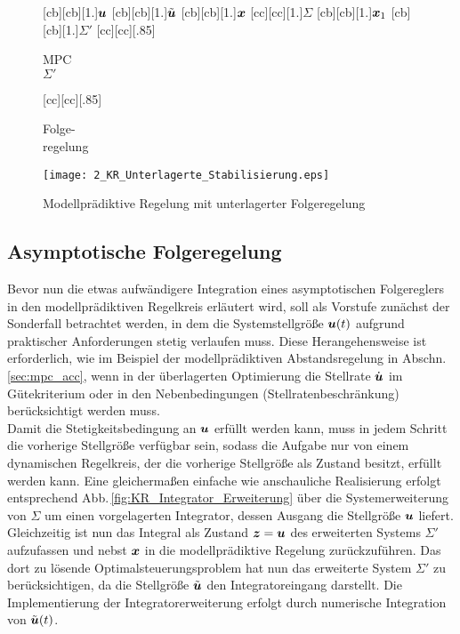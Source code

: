 \begin{figure}[h]
\centering
\newcommand{\smallsize}{.85}
		[cb][cb][1.]{$\boldsymbol{u}$}
		[cb][cb][1.]{$\tilde{\boldsymbol{u}}$}
		[cb][cb][1.]{$\boldsymbol{x}$}
		[cc][cc][1.]{$\Sigma$}
		[cb][cb][1.]{$\boldsymbol{x}_1$}
		[cb][cb][1.]{$\Sigma'$}
		[cc][cc][\smallsize]{\parbox[c]{7cm}{\begin{center}MPC\\ $\Sigma'$ \end{center}}}
				[cc][cc][\smallsize]{\parbox[c]{7cm}{\begin{center}Folge- \\ regelung \end{center}}}
	\texttt{[image: 2\_KR\_Unterlagerte\_Stabilisierung.eps]}
	\caption{Modellprädiktive Regelung mit unterlagerter Folgeregelung}
	\label{fig:KR_Unterlagerte_Stabilisierung}
\end{figure}

\subsection{Asymptotische Folgeregelung} \label{sec:asymptotische_folgeregelung}
Bevor nun die etwas aufwändigere Integration eines asymptotischen Folgereglers in den modellprädiktiven Regelkreis erläutert wird, soll als Vorstufe zunächst der Sonderfall betrachtet werden, in dem die Systemstellgröße $\boldsymbol{u}(t)$ aufgrund praktischer Anforderungen stetig verlaufen muss. Diese Herangehensweise ist erforderlich, wie im Beispiel der modellprädiktiven Abstandsregelung in Abschn.\,\ref{sec:mpc_acc}, wenn in der überlagerten Optimierung die Stellrate $\dot{\boldsymbol{u}}$ im Gütekriterium oder in den Nebenbedingungen (Stellratenbeschränkung) berücksichtigt werden muss. \\
Damit die Stetigkeitsbedingung an $\boldsymbol{u}$ erfüllt werden kann, muss in jedem Schritt die vorherige Stellgröße verfügbar sein, sodass die Aufgabe nur von einem dynamischen Regelkreis, der die vorherige Stellgröße als Zustand besitzt, erfüllt werden kann. Eine gleichermaßen einfache wie anschauliche Realisierung erfolgt entsprechend Abb.\,\ref{fig:KR_Integrator_Erweiterung} über die Systemerweiterung von $\Sigma$ um einen vorgelagerten Integrator, dessen Ausgang die Stellgröße $\boldsymbol{u}$ liefert. Gleichzeitig ist nun das Integral als Zustand $\boldsymbol{z}=\boldsymbol{u}$ des erweiterten Systems $\Sigma'$ aufzufassen und nebst $\boldsymbol{x}$ in die modellprädiktive Regelung zurückzuführen. Das dort zu lösende Optimalsteuerungsproblem hat nun das erweiterte System $\Sigma'$ zu berücksichtigen, da die Stellgröße $\tilde{\boldsymbol{u}}$ den Integratoreingang darstellt. Die Implementierung der Integratorerweiterung erfolgt durch numerische Integration von $\tilde{\boldsymbol{u}}(t)$.

